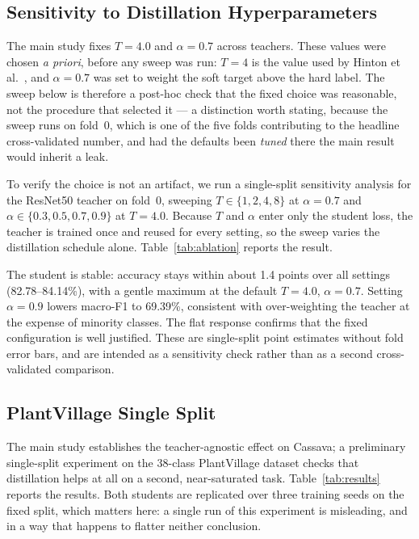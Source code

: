 \documentclass[conference]{IEEEtran}
\begin{document}
\subsection{Sensitivity to Distillation Hyperparameters}

The main study fixes $T=4.0$ and $\alpha=0.7$ across teachers. These values were
chosen \emph{a priori}, before any sweep was run: $T=4$ is the value used by
Hinton et al.\ \cite{hinton2015distilling}, and $\alpha=0.7$ was set to weight the
soft target above the hard label. The sweep below is therefore a post-hoc check
that the fixed choice was reasonable, not the procedure that selected it --- a
distinction worth stating, because the sweep runs on fold~0, which is one of the
five folds contributing to the headline cross-validated number, and had the
defaults been \emph{tuned} there the main result would inherit a leak.

To verify the choice is not an artifact, we run a single-split sensitivity
analysis for the ResNet50 teacher on fold~0, sweeping $T\in\{1,2,4,8\}$ at
$\alpha=0.7$ and $\alpha\in\{0.3,0.5,0.7,0.9\}$ at $T=4.0$. Because $T$ and
$\alpha$ enter only the student loss, the teacher is trained once and reused for
every setting, so the sweep varies the distillation schedule alone.
Table~\ref{tab:ablation} reports the result.



The student is stable: accuracy stays within about 1.4 points over all settings
(82.78--84.14\%), with a gentle maximum at the default $T=4.0$, $\alpha=0.7$.
Setting $\alpha=0.9$ lowers macro-F1 to 69.39\%, consistent with
over-weighting the teacher at the expense of minority classes. The flat
response confirms that the fixed configuration is well justified. These are
single-split point estimates without fold error bars, and are intended as a
sensitivity check rather than as a second cross-validated comparison.

\subsection{PlantVillage Single Split}
\label{sec:pv}

The main study establishes the teacher-agnostic effect on Cassava; a preliminary
single-split experiment on the 38-class PlantVillage dataset checks that
distillation helps at all on a second, near-saturated task.
Table~\ref{tab:results} reports the results. Both students are replicated over
three training seeds on the fixed split, which matters here: a single run of this
experiment is misleading, and in a way that happens to flatter neither conclusion.
\end{document}

